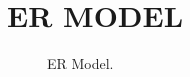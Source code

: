 \chapter{ER MODEL}\label{er}

\begin{figure}[H]
	\begin{center}
	\end{center}
	\caption{ER Model.}
\end{figure}
